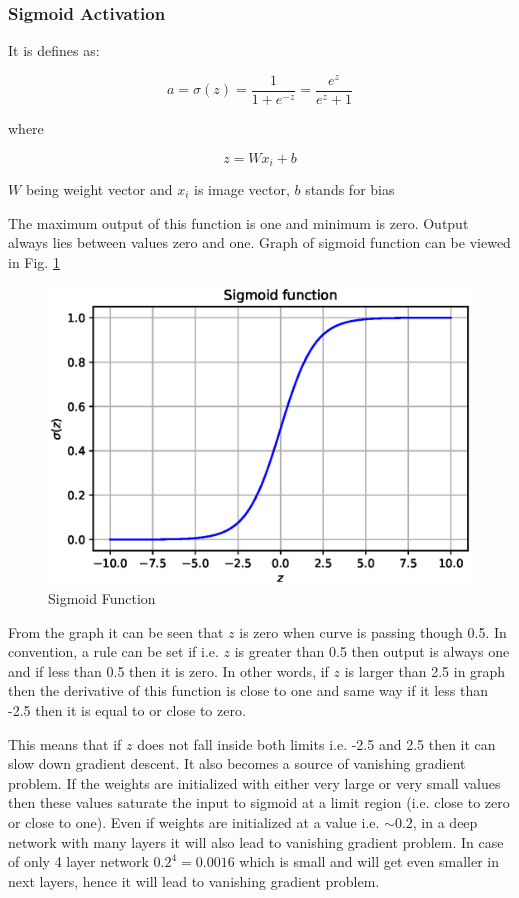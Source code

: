 \documentclass[11pt]{article}
\begin{document}
\subsubsection{Sigmoid Activation}
It is defines as:

\begin{equation}
a = \sigma(z) = \frac{1}{1+e^{-z}}=\frac{e^{z}}{e^{z}+1}
\end{equation}

where

\begin{equation}
z = Wx_i + b
\end{equation}

$W$ being weight vector and $x_i$ is image vector, $b$ stands for bias

The maximum output of this function is one and minimum is zero. Output always lies between values zero and one. Graph of sigmoid function can be viewed in Fig. \ref{Sigmoid}

\begin{figure}[ht!]
	\centering
	\includegraphics[width=.6\linewidth]{files/cnn_architecture/sigmoid.eps}
	\caption{Sigmoid Function}
	\label{Sigmoid}
\end{figure}

From the graph it can be seen that $z$ is zero when curve is passing though 0.5. In convention, a rule can be set if i.e. $z$ is greater than 0.5 then output is always one and if less than 0.5 then it is zero. In other words, if $z$ is larger than 2.5 in graph then the derivative of this function is close to one and same way if it less than -2.5 then it is equal to or close to zero.

This means that if $z$ does not fall inside both limits i.e. -2.5 and 2.5 then it can slow down gradient descent. It also becomes a source of vanishing gradient problem. If the weights are initialized with either very large or very small values then these values saturate the input to sigmoid at a limit region (i.e. close to zero or close to one). Even if weights are initialized at a value i.e. $\sim 0.2$, in a deep network with many layers it will also lead to vanishing gradient problem. In case of only 4 layer network $0.2^{4}=0.0016$ which is small and will get even smaller in next layers, hence it will lead to vanishing gradient problem.
\end{document}
